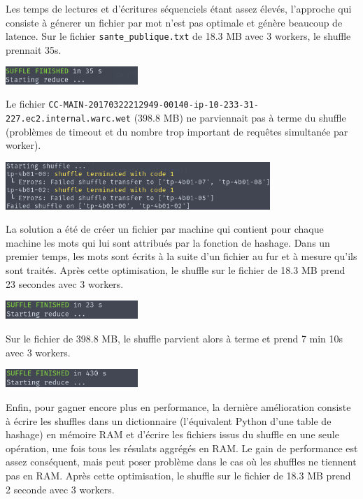\documentclass[11pt,a4paper]{article}
\begin{document}
Les temps de lectures et d'écritures séquenciels étant assez élevés, l'approche qui consiste à génerer un fichier par mot n'est pas optimale et génère beaucoup de latence. Sur le fichier \texttt{sante\_publique.txt} de 18.3 MB avec 3 workers, le shuffle prennait 35s.

\includegraphics[width=5cm]{screenshot_shuffle1.png}

Le fichier \texttt{CC-MAIN-20170322212949-00140-ip-10-233-31-227.ec2.internal.warc.wet} (398.8 MB) ne parviennait pas à terme du shuffle (problèmes de timeout et du nombre trop important de requêtes simultanée par worker).

\includegraphics[width=10cm]{screenshot_shuffle2.png}

La solution a été de créer un fichier par machine qui contient pour chaque machine les mots qui lui sont attribués par la fonction de hashage. Dans un premier temps, les mots sont écrits à la suite d'un fichier au fur et à mesure qu'ils sont traités. Après cette optimisation, le shuffle sur le fichier de 18.3 MB prend 23 secondes avec 3 workers.

\includegraphics[width=5cm]{screenshot_shuffle3.png}

Sur le fichier de 398.8 MB, le shuffle parvient alors à terme et prend 7 min 10s avec 3 workers.

\includegraphics[width=5cm]{screenshot_shuffle4.png}

Enfin, pour gagner encore plus en performance, la dernière amélioration consiste à écrire les shuffles dans un dictionnaire (l'équivalent Python d'une table de hashage) en mémoire RAM et d'écrire les fichiers issus du shuffle en une seule opération, une fois tous les résulats aggrégés en RAM. Le gain de performance est assez conséquent, mais peut poser problème dans le cas où les shuffles ne tiennent pas en RAM. Après cette optimisation, le shuffle sur le fichier de 18.3 MB prend 2 seconde avec 3 workers.
\end{document}
